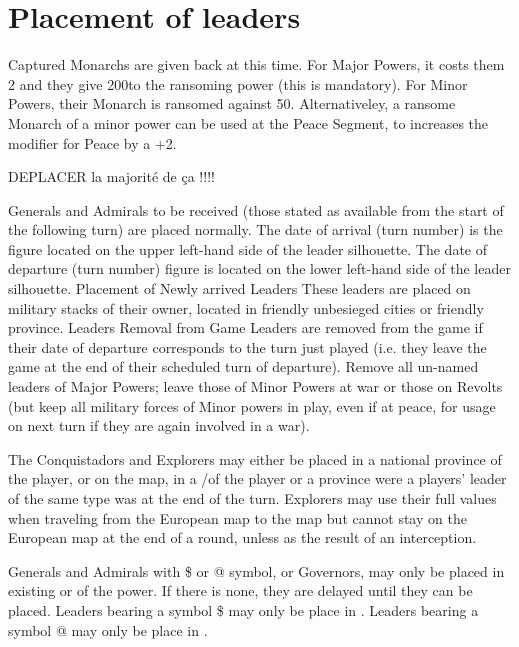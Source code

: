 \section{Placement of leaders}

Captured Monarchs are given back at this time.
\bparag For Major Powers, it costs them 2 \STAB and they give 200\ducats to
the ransoming power (this is mandatory).
\bparag For Minor Powers, their Monarch is ransomed against 50\ducats.
\bparag Alternativeley, a ransome Monarch of a minor power can be used at the
Peace Segment, to increases the modifier for Peace by a +2.

\begin{todo}
  DEPLACER la majorité de ça !!!!
\end{todo}
\aparag Generals and Admirals to be received (those stated as available from
the start of the following turn) are placed normally.
The date of arrival (turn number) is the figure located on the upper left-hand
side of the leader silhouette.  The date of departure (turn number) figure is
located on the lower left-hand side of the leader silhouette.
\bparag Placement of Newly arrived Leaders These leaders are placed on
military stacks of their owner, located in friendly unbesieged cities or
friendly province.
\bparag Leaders Removal from Game Leaders are removed from the game if their
date of departure corresponds to the turn just played (i.e. they leave the
game at the end of their scheduled turn of departure).
\bparag Remove all un-named leaders of Major Powers; leave those of Minor
Powers at war or those on Revolts (but keep all military forces of Minor
powers in play, even if at peace, for usage on next turn if they are again
involved in a war).

The Conquistadors and Explorers may either be placed in a national province of
the player, or on the \ROTW map, in a \COL/\TP of the player or a province
were a players' leader of the same type was at the end of the turn.
\bparag Explorers may use their full values when traveling from the European
map to the \ROTW map but cannot stay on the European map at the end of a
round, unless as the result of an interception.

Generals and Admirals with \$ or @ symbol, or Governors, may only be placed in
existing \COL or \TP of the power. If there is none, they are delayed until
they can be placed.
\bparag Leaders bearing a symbol \$ may only be place in .
\bparag Leaders bearing a symbol @ may only be place in .



